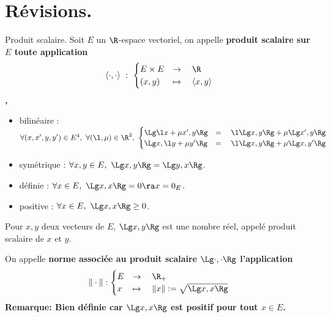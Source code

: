 \documentclass[11pt]{article}
\begin{document}


\renewcommand*{\D}{\cursive{D}}
\newcommand*{\SO}{\nt{SO}}

\vspace*{-0.8cm}

\section{Révisions.}

\begin{defi}{Produit scalaire.}{}
    Soit $E$ un $\R$-espace vectoriel, on appelle \bf{produit scalaire} sur $E$ toute application
    \begin{equation*}
        \langle \cdot,\cdot \rangle ~ : ~ \begin{cases} E\times E &\to \quad \R \\ (x,y) &\mapsto \quad \langle x, y \rangle\end{cases}
    \end{equation*},
    \begin{itemize}
        \item bilinéaire : $\forall(x,x',y,y')\in E^4, ~ \forall(\l,\mu)\in\R^2, ~ \begin{cases}\Lg\l x + \mu x', y\Rg &= \quad \l\Lg x,y \Rg + \mu\Lg x', y \Rg\\\Lg x, \l y + \mu y' \Rg &= \quad \l\Lg x, y \Rg + \mu \Lg x, y' \Rg\end{cases}$
        \item symétrique : $\forall x,y\in E, ~ \Lg x, y \Rg = \Lg y, x \Rg$.
        \item définie : $\forall x \in E, ~ \Lg x, x \Rg = 0 \ra x = 0_E$.
        \item positive : $\forall x \in E, ~ \Lg x, x \Rg \geq 0$.
    \end{itemize}
    Pour $x,y$ deux vecteurs de $E$, $\Lg x, y\Rg$ est une nombre réel, appelé produit scalaire de $x$ et $y$.
\end{defi}

\vspace*{-0.8cm}

\begin{defi}{}{}
    On appelle \bf{norme associée au produit scalaire} $\Lg\cdot,\cdot\Rg$ l'application
    \begin{equation*}
        \|\cdot\|:\begin{cases}E&\to\quad\R_+\\x&\mapsto\quad\|x\|:=\sqrt{\Lg x,x\Rg}\end{cases}
    \end{equation*}
    \bf{Remarque:} Bien définie car $\Lg x,x \Rg$ est positif pour tout $x\in E$.
\end{defi}
\end{document}

